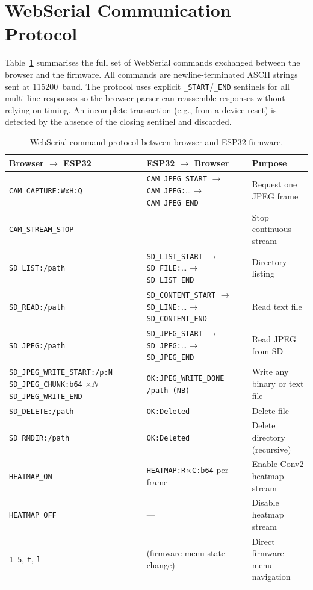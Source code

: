 \documentclass[11pt]{article}
\begin{document}
\section{WebSerial Communication Protocol}

Table~\ref{tab:protocol} summarises the full set of WebSerial commands exchanged
between the browser and the firmware. All commands are newline-terminated ASCII strings
sent at 115200~baud. The protocol uses explicit \texttt{\_START}/\texttt{\_END}
sentinels for all multi-line responses so the browser parser can reassemble responses
without relying on timing. An incomplete transaction (e.g., from a device reset) is
detected by the absence of the closing sentinel and discarded.

\begin{table}[h]
\centering
\caption{WebSerial command protocol between browser and ESP32 firmware.}
\label{tab:protocol}
\begin{tabular}{@{}p{4.3cm}p{4.0cm}p{5.7cm}@{}}
\toprule
\textbf{Browser $\rightarrow$ ESP32} & \textbf{ESP32 $\rightarrow$ Browser} & \textbf{Purpose} \\
\midrule
\texttt{CAM\_CAPTURE:WxH:Q}
  & \texttt{CAM\_JPEG\_START} $\to$ \texttt{CAM\_JPEG:}\ldots $\to$ \texttt{CAM\_JPEG\_END}
  & Request one JPEG frame \\[4pt]
\texttt{CAM\_STREAM\_STOP}
  & ---
  & Stop continuous stream \\[4pt]
\texttt{SD\_LIST:/path}
  & \texttt{SD\_LIST\_START} $\to$ \texttt{SD\_FILE:}\ldots $\to$ \texttt{SD\_LIST\_END}
  & Directory listing \\[4pt]
\texttt{SD\_READ:/path}
  & \texttt{SD\_CONTENT\_START} $\to$ \texttt{SD\_LINE:}\ldots $\to$ \texttt{SD\_CONTENT\_END}
  & Read text file \\[4pt]
\texttt{SD\_JPEG:/path}
  & \texttt{SD\_JPEG\_START} $\to$ \texttt{SD\_JPEG:}\ldots $\to$ \texttt{SD\_JPEG\_END}
  & Read JPEG from SD \\[4pt]
\texttt{SD\_JPEG\_WRITE\_START:/p:N} \newline
\texttt{SD\_JPEG\_CHUNK:b64} $\times N$ \newline
\texttt{SD\_JPEG\_WRITE\_END}
  & \texttt{OK:JPEG\_WRITE\_DONE /path (NB)}
  & Write any binary or text file \\[4pt]
\texttt{SD\_DELETE:/path}
  & \texttt{OK:Deleted}
  & Delete file \\[4pt]
\texttt{SD\_RMDIR:/path}
  & \texttt{OK:Deleted}
  & Delete directory (recursive) \\[4pt]
\texttt{HEATMAP\_ON}
  & \texttt{HEATMAP:R}$\times$\texttt{C:b64} per frame
  & Enable Conv2 heatmap stream \\[4pt]
\texttt{HEATMAP\_OFF}
  & ---
  & Disable heatmap stream \\[4pt]
\texttt{1}--\texttt{5}, \texttt{t}, \texttt{l}
  & (firmware menu state change)
  & Direct firmware menu navigation \\
\bottomrule
\end{tabular}
\end{table}
\end{document}
